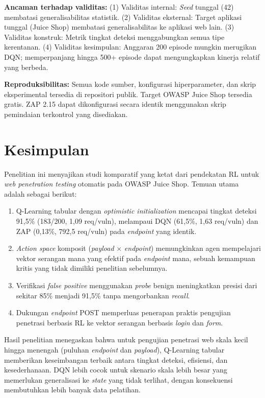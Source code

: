 \documentclass[a4paper,12pt]{article}
\begin{document}
\textbf{Ancaman terhadap validitas:} (1) Validitas internal: \textit{Seed} tunggal (42) membatasi generalisabilitas statistik. (2) Validitas eksternal: Target aplikasi tunggal (Juice Shop) membatasi generalisabilitas ke aplikasi web lain. (3) Validitas konstruk: Metrik tingkat deteksi menggabungkan semua tipe kerentanan. (4) Validitas kesimpulan: Anggaran 200 episode mungkin merugikan DQN; memperpanjang hingga 500+ episode dapat mengungkapkan kinerja relatif yang berbeda.

\textbf{Reproduksibilitas:} Semua kode sumber, konfigurasi hiperparameter, dan skrip eksperimental tersedia di repositori publik. Target OWASP Juice Shop tersedia gratis. ZAP 2.15 dapat dikonfigurasi secara identik menggunakan skrip pemindaian terkontrol yang disediakan.

\section{Kesimpulan}

Penelitian ini menyajikan studi komparatif yang ketat dari pendekatan RL untuk \textit{web penetration testing} otomatis pada OWASP Juice Shop. Temuan utama adalah sebagai berikut:

\begin{enumerate}
  \item Q-Learning tabular dengan \textit{optimistic initialization} mencapai tingkat deteksi 91,5\% (183/200, 1,09 req/vuln), melampaui DQN (61,5\%, 1,63 req/vuln) dan ZAP (0,13\%, 792,5 req/vuln) pada \textit{endpoint} yang identik.
  \item \textit{Action space} komposit (\textit{payload} $\times$ \textit{endpoint}) memungkinkan agen mempelajari vektor serangan mana yang efektif pada \textit{endpoint} mana, sebuah kemampuan kritis yang tidak dimiliki penelitian sebelumnya.
  \item Verifikasi \textit{false positive} menggunakan \textit{probe} benign meningkatkan presisi dari sekitar 85\% menjadi 91,5\% tanpa mengorbankan \textit{recall}.
  \item Dukungan \textit{endpoint} POST memperluas penerapan praktis pengujian penetrasi berbasis RL ke vektor serangan berbasis \textit{login} dan \textit{form}.
\end{enumerate}

Hasil penelitian menegaskan bahwa untuk pengujian penetrasi web skala kecil hingga menengah (puluhan \textit{endpoint} dan \textit{payload}), Q-Learning tabular memberikan keseimbangan terbaik antara tingkat deteksi, efisiensi, dan kesederhanaan. DQN lebih cocok untuk skenario skala lebih besar yang memerlukan generalisasi ke \textit{state} yang tidak terlihat, dengan konsekuensi membutuhkan lebih banyak data pelatihan.
\end{document}
